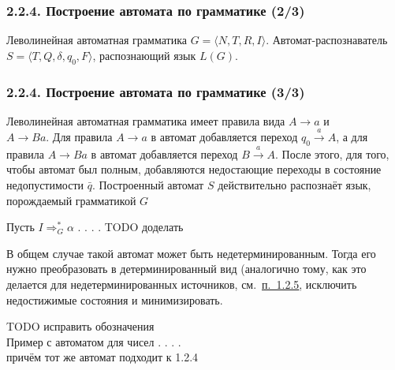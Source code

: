 \documentclass[mathserif,12pt,aspectratio=169]{beamer}
\def\Assign{\operatorname{:=}}
\def\DMref#1#2{{\color{blue}\underline{\hyperlink{#2}{#1}}}}
\def\TODO#1{{\color{gray} TODO {#1}}}
\begin{document}
\begin{frame}
\frametitle{2.2.4. Построение автомата по грамматике (2/3)}

\vspace{-2pt}
{\linespread{0.9}\selectfont
\begin{algorithmic}
\REQUIRE Леволинейная автоматная грамматика $G=\langle N, T, R,I\rangle$.
\ENSURE Автомат-распознаватель $S=\langle T, Q,
\delta, q_0, F\rangle$,
распознающий язык $L(G)$.
\STATE{\textbf{$Q\Assign N\cup \{q_0\}\cup\{\bar{q}\}$}}
    \STATE {\textbf{$\delta(q_0,a)\Assign \delta(q_0,a)\cup A$}}
  \ELSE
    \STATE{\textbf{$\delta(B,a)\Assign \delta(B,a)\cup A$}}
  \ENDIF
\ENDFOR
{}
      \STATE{\textbf{$\delta(q,a)\Assign \bar{q}$}}
    \ENDIF
  \ENDFOR
\ENDFOR
\STATE {\textbf{$F\Assign\{I\}$}}
\end{algorithmic}
}
\end{frame}


\begin{frame}
\frametitle{2.2.4. Построение автомата по грамматике (3/3)}
\begin{ground}
Леволинейная автоматная грамматика имеет правила вида
$A\rightarrow a$ и \\$A\rightarrow Ba$.
Для правила $A\rightarrow a$ в автомат
добавляется переход $q_0\stackrel{a}\longrightarrow A$, а
для правила $A\rightarrow Ba$ в автомат
добавляется переход $B \stackrel{a}\longrightarrow A$.
После этого, для того, чтобы автомат был полным,
добавляются недостающие переходы в состояние недопустимости $\bar{q}$.
Построенный автомат $S$ действительно распознаёт язык,
порождаемый грамматикой $G$

Пусть $I \Rightarrow_{G}^{*} \alpha$ . . . .\TODO{доделать}

\end{ground}

В общем случае такой автомат может быть недетерминированным.
Тогда его нужно преобразовать в детерминированный вид
(аналогично тому, как это делается для недетерминированных
источников, см.~\DMref{п.~1.2.5}{1.2.5.}, исключить недостижимые
состояния и минимизировать.

\begin{example}


\TODO{исправить обозначения\\
Пример с автоматом для чисел . . . . \\
причём тот же автомат подходит к 1.2.4}
\end{example}

\end{frame}
\end{document}

